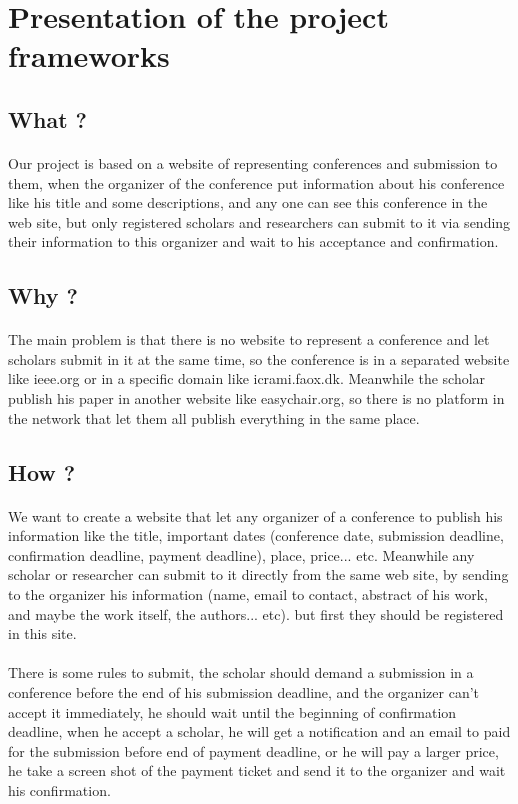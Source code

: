 \section{Presentation of the project frameworks}
	\subsection{What ?}
		\paragraph{}
		Our project is based on a website of representing conferences and submission to them, when the organizer of the conference put information about his conference like his title and some descriptions, and any one can see this conference in the web site, but only registered scholars and researchers can submit to it via sending their information to this organizer and wait to his acceptance and confirmation.
	\subsection{Why ?}
		\paragraph{}
		The main problem is that there is no website to represent a conference and let scholars submit in it at the same time, so the conference is in a separated website like ieee.org or in a specific domain like icrami.faox.dk. Meanwhile the scholar publish his paper in another website like easychair.org, so there is no platform in the network that let them all publish everything in the same place.
	\subsection{How ?}
		\paragraph{}
		We want to create a website that let any organizer of a conference to publish his information like the title, important dates (conference date, submission deadline, confirmation deadline, payment deadline), place, price... etc. Meanwhile any scholar or researcher can submit to it directly from the same web site, by sending to the organizer his information (name, email to contact, abstract of his work, and maybe the work itself, the authors... etc). but first they should be registered in this site.
		\paragraph{}
		There is some rules to submit, the scholar should demand a submission in a conference before the end of his submission deadline, and the organizer can't accept it immediately, he should wait until the beginning of confirmation deadline, when he accept a scholar, he will get a notification and an email to paid for the submission before end of payment deadline, or he will pay a larger price, he take a screen shot of the payment ticket and send it to the organizer and wait his confirmation.